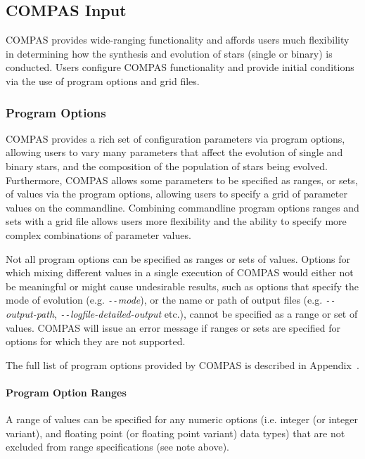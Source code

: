\subsection{COMPAS Input}\label{sec:COMPASInput}

COMPAS provides wide-ranging functionality and affords users much flexibility in determining how the synthesis and evolution of stars (single or binary) is conducted.  Users configure COMPAS functionality and provide initial conditions via the use of program options and grid files.

\subsubsection{Program Options}\label{sec:ProgramOptions}

COMPAS provides a rich set of configuration parameters via program options, allowing users to vary many parameters that affect the evolution of single and binary stars, and the composition of the population of stars being evolved. Furthermore, COMPAS allows some parameters to be specified as ranges, or sets, of values via the program options, allowing users to specify a grid of parameter values on the commandline.  Combining commandline program options ranges and sets with a grid file allows users more flexibility and the ability to specify more complex combinations of parameter values.

Not all program options can be specified as ranges or sets of values.  Options for which mixing different values in a single execution of COMPAS would either not be meaningful or might cause undesirable results, such as options that specify the mode of evolution (e.g. \texttt{-{}-}\textit{mode}), or the name or path of output files (e.g. \texttt{-{}-}\textit{output-path}, \texttt{-{}-}\textit{logfile-detailed-output} etc.), cannot be specified as a range or set of values. COMPAS will issue an error message if ranges or sets are specified for options for which they are not supported.

The full list of program options provided by COMPAS is described in Appendix~. 

\paragraph{Program Option Ranges}\label{sec:ProgramOptionsRanges}\mbox{}

A range of values can be specified for any numeric options (i.e. integer (or integer variant), and floating point (or floating point variant) data types) that are not excluded from range specifications (see note above).


